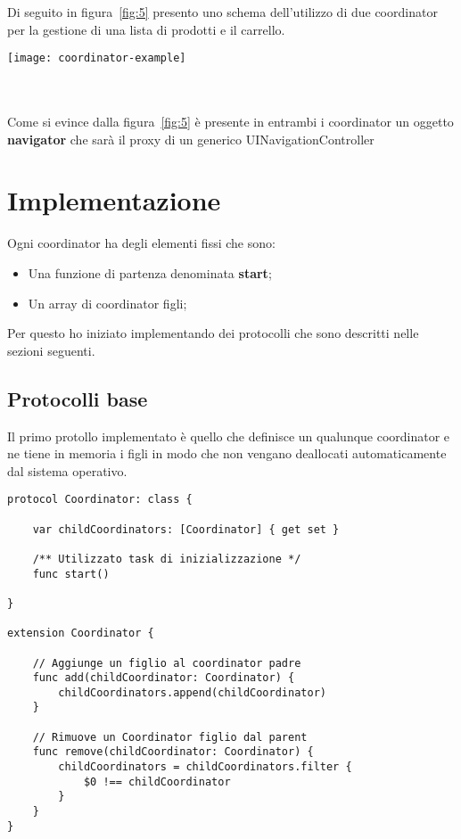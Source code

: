 Di seguito in figura~\ref{fig:5} presento uno schema dell'utilizzo di due coordinator
per la gestione di una lista di prodotti e il carrello. \\

\begin{minipage}{\linewidth}
    \centering
    \texttt{[image: coordinator-example]}
    \label{fig:5}
\end{minipage} \\\\

Come si evince dalla figura~\ref{fig:5} è presente in entrambi i coordinator un oggetto
\textbf{navigator} che sarà il proxy di un generico UINavigationController

\section{Implementazione}

Ogni coordinator ha degli elementi fissi che sono:

\begin{itemize}
    \item Una funzione di partenza denominata \textbf{start};
    \item Un array di coordinator figli;
\end{itemize}

Per questo ho iniziato implementando dei protocolli che sono descritti nelle sezioni seguenti.
\subsection{Protocolli base}

Il primo protollo implementato è quello che definisce un qualunque coordinator
e ne tiene in memoria i figli in modo che non vengano
deallocati automaticamente dal sistema operativo.

\begin{verbatim}
protocol Coordinator: class {

    var childCoordinators: [Coordinator] { get set }
    
    /** Utilizzato task di inizializzazione */
    func start()
    
}

extension Coordinator {
    
    // Aggiunge un figlio al coordinator padre
    func add(childCoordinator: Coordinator) {
        childCoordinators.append(childCoordinator)
    }
    
    // Rimuove un Coordinator figlio dal parent
    func remove(childCoordinator: Coordinator) {
        childCoordinators = childCoordinators.filter {
            $0 !== childCoordinator 
        }
    }
}
\end{verbatim}

